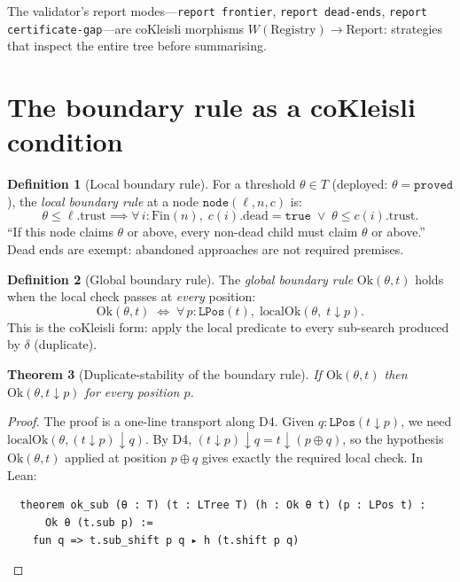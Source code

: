 \documentclass[11pt,a4paper]{article}
\theoremstyle{definition}
\newtheorem{definition}{Definition}[section]
\theoremstyle{plain}
\newtheorem{theorem}[definition]{Theorem}
\theoremstyle{remark}
\newcommand{\sub}{\mathop{\downarrow}}
\begin{document}
The validator's report modes---\texttt{report frontier},
\texttt{report dead-ends}, \texttt{report certificate-gap}---are
coKleisli morphisms $W(\text{Registry}) \to \text{Report}$: strategies
that inspect the entire tree before summarising.

\section{The boundary rule as a coKleisli condition}

\begin{definition}[Local boundary rule]
For a threshold $\theta \in T$ (deployed: $\theta = \texttt{proved}$),
the \emph{local boundary rule} at a node $\texttt{node}(\ell, n, c)$ is:
\[
  \theta \le \ell.\mathrm{trust} \implies
  \forall\, i : \mathrm{Fin}(n),\;
  c(i).\mathrm{dead} = \texttt{true} \;\lor\; \theta \le c(i).\mathrm{trust}.
\]
``If this node claims $\theta$ or above, every non-dead child must
claim $\theta$ or above.'' Dead ends are exempt: abandoned approaches
are not required premises.
\end{definition}

\begin{definition}[Global boundary rule]
The \emph{global boundary rule} $\mathrm{Ok}(\theta, t)$ holds when
the local check passes at \emph{every} position:
\[
  \mathrm{Ok}(\theta, t) \;\iff\;
  \forall\, p : \texttt{LPos}(t),\;
  \mathrm{localOk}(\theta,\; t \sub p).
\]
This is the coKleisli form: apply the local predicate to every
sub-search produced by $\delta$ (duplicate).
\end{definition}

\begin{theorem}[Duplicate-stability of the boundary rule]
\label{thm:ok-sub}
If\/ $\mathrm{Ok}(\theta, t)$ then $\mathrm{Ok}(\theta, t \sub p)$
for every position $p$.
\end{theorem}

\begin{proof}
The proof is a one-line transport along D4. Given $q : \texttt{LPos}(t \sub p)$, we need $\mathrm{localOk}(\theta, (t \sub p) \sub q)$. By D4, $(t \sub p) \sub q = t \sub (p \oplus q)$, so the hypothesis $\mathrm{Ok}(\theta, t)$ applied at position $p \oplus q$ gives exactly the required local check. In Lean:
\begin{verbatim}
  theorem ok_sub (θ : T) (t : LTree T) (h : Ok θ t) (p : LPos t) :
      Ok θ (t.sub p) :=
    fun q => t.sub_shift p q ▸ h (t.shift p q)
\end{verbatim}
\end{proof}
\end{document}
